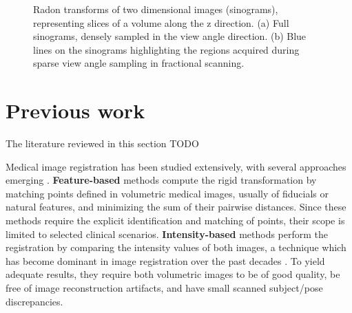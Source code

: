\begin{figure}[t]
  \centering
  \hfill
  \caption{\small{Radon transforms of two dimensional images (sinograms), representing slices of a volume along the z direction. (a) Full sinograms, densely sampled in the view angle direction. (b) Blue lines on the sinograms highlighting the regions acquired during sparse view angle sampling in fractional scanning.}}
    \label{fig:figures/fractional}
\end{figure}

\section{Previous work}

The literature reviewed in this section TODO

Medical image registration has been studied extensively, with several approaches emerging \cite{maintz1998survey}.
\textbf{Feature-based} methods compute the rigid transformation by matching points defined in volumetric medical images, usually of fiducials or natural features, and minimizing the sum of their pairwise distances. Since these methods require the explicit identification and matching of points, their scope is limited to selected clinical scenarios. 
\textbf{Intensity-based} methods perform the registration by comparing the intensity values of both images, a technique which has become dominant in image registration over the past decades \cite{viergever2016survey}. To yield adequate results, they require both volumetric images to be of good quality, be free of image reconstruction artifacts, and have small scanned subject/pose discrepancies.

